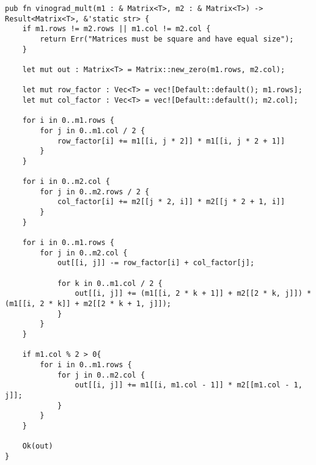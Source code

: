 \begin{lstlisting}[caption=Алгоритм умножения матриц Винограда, label=list:vinograd, language={}]
pub fn vinograd_mult(m1 : & Matrix<T>, m2 : & Matrix<T>) -> Result<Matrix<T>, &'static str> {
    if m1.rows != m2.rows || m1.col != m2.col {
        return Err("Matrices must be square and have equal size");
    }

    let mut out : Matrix<T> = Matrix::new_zero(m1.rows, m2.col);

    let mut row_factor : Vec<T> = vec![Default::default(); m1.rows];
    let mut col_factor : Vec<T> = vec![Default::default(); m2.col];

    for i in 0..m1.rows {
        for j in 0..m1.col / 2 {
            row_factor[i] += m1[[i, j * 2]] * m1[[i, j * 2 + 1]]
        }
    }

    for i in 0..m2.col {
        for j in 0..m2.rows / 2 {
            col_factor[i] += m2[[j * 2, i]] * m2[[j * 2 + 1, i]]
        }
    }

    for i in 0..m1.rows {
        for j in 0..m2.col {
            out[[i, j]] -= row_factor[i] + col_factor[j];

            for k in 0..m1.col / 2 {
                out[[i, j]] += (m1[[i, 2 * k + 1]] + m2[[2 * k, j]]) * (m1[[i, 2 * k]] + m2[[2 * k + 1, j]]);
            }
        }
    }

    if m1.col % 2 > 0{
        for i in 0..m1.rows {
            for j in 0..m2.col {
                out[[i, j]] += m1[[i, m1.col - 1]] * m2[[m1.col - 1, j]];
            }
        }
    }

    Ok(out)
}
\end{lstlisting}

